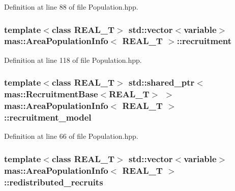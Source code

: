 Definition at line 88 of file Population.\-hpp.

\hypertarget{structmas_1_1_area_population_info_a9e811bb777f1568893088289284399de}{
\subsubsection[{recruitment}]{\setlength{\rightskip}{0pt plus 5cm}template$<$class R\-E\-A\-L\-\_\-\-T$>$ std\-::vector$<${\bf variable}$>$ {\bf mas\-::\-Area\-Population\-Info}$<$ R\-E\-A\-L\-\_\-\-T $>$\-::recruitment}}\label{structmas_1_1_area_population_info_a9e811bb777f1568893088289284399de}


Definition at line 118 of file Population.\-hpp.

\hypertarget{structmas_1_1_area_population_info_a59e658dc82c72ae21f3b52d84ad5ec25}{
\subsubsection[{recruitment\-\_\-model}]{\setlength{\rightskip}{0pt plus 5cm}template$<$class R\-E\-A\-L\-\_\-\-T$>$ std\-::shared\-\_\-ptr$<${\bf mas\-::\-Recruitment\-Base}$<$R\-E\-A\-L\-\_\-\-T$>$ $>$ {\bf mas\-::\-Area\-Population\-Info}$<$ R\-E\-A\-L\-\_\-\-T $>$\-::recruitment\-\_\-model}}\label{structmas_1_1_area_population_info_a59e658dc82c72ae21f3b52d84ad5ec25}


Definition at line 66 of file Population.\-hpp.

\hypertarget{structmas_1_1_area_population_info_a53541078254449fb756b436519339f57}{
\subsubsection[{redistributed\-\_\-recruits}]{\setlength{\rightskip}{0pt plus 5cm}template$<$class R\-E\-A\-L\-\_\-\-T$>$ std\-::vector$<${\bf variable}$>$ {\bf mas\-::\-Area\-Population\-Info}$<$ R\-E\-A\-L\-\_\-\-T $>$\-::redistributed\-\_\-recruits}}\label{structmas_1_1_area_population_info_a53541078254449fb756b436519339f57}


